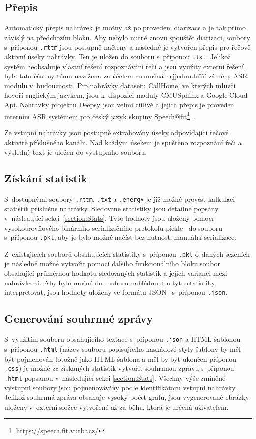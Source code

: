 \subsection{Přepis}
Automatický přepis nahrávek je možný až po provedení diarizace a je tak přímo závislý na předchozím bloku. Aby nebylo nutné znovu spouštět diarizaci, soubory s~příponou \texttt{.rttm} jsou postupně načteny a následně je vytvořen přepis pro řečově aktivní úseky nahrávky. Ten je uložen do souboru s~příponou \texttt{.txt}. Jelikož systém neobsahuje vlastní řešení rozpoznávání řeči a jsou využity externí řešení, byla tato část systému navržena za účelem co možná nejjednodušší záměny ASR modulu v~budoucnosti. Pro nahrávky datasetu CallHome, ve kterých mluvčí hovoří anglickým jazykem, jsou k~dispozici moduly CMUSphinx a Google Cloud Api. Nahrávky projektu Deepsy jsou velmi citlivé a jejich přepis je proveden interním ASR systémem pro český jazyk skupiny Speech@fit\footnote{\url{https://speech.fit.vutbr.cz/}}~\cite{ASR_FIT}. 

Ze vstupní nahrávky jsou postupně extrahovány úseky odpovídající řečové aktivitě příslušného kanálu. Nad každým úsekem je spuštěno rozpoznání řeči a výsledný text je uložen do výstupního souboru.

\subsection{Získání statistik}
S~dostupnými soubory \texttt{.rttm}, \texttt{.txt} a \texttt{.energy} je již možné provést kalkulaci statistik příslušné nahrávky. Sledované statistiky jsou detailně popsány v~následující sekci~\ref{section:Stats}. Tyto hodnoty jsou uloženy pomocí vysokoúrovňového binárního serializačního protokolu pickle~\cite{Pickle} do souboru s~příponou \texttt{.pkl}, aby je bylo možné načíst bez nutnosti manuální serializace.

Z~existujících souborů obsahujících statistiky s~příponou \texttt{.pkl} o~daných sezeních je následně možné vytvořit pomocí dalšího funkcionálního bloku soubor obsahující průměrnou hodnotu sledovaných statistik a jejich varianci mezi nahrávkami. Aby bylo možné do souboru nahlédnout a tyto statistiky interpretovat, jsou hodnoty uloženy ve formátu JSON~\cite{json} s~příponou \texttt{.json}.

\subsection{Generování souhrnné zprávy}
S~využitím souboru obsahujícího textace s~příponou \texttt{.json} a HTML šablonou s~příponou \texttt{.html} (název souboru popisujícího kaskádové styly šablony by měl být pojmenován totožně jako HTML šablona a měl by být ukončen příponou \texttt{.css}) je možné ze získaných statistik vytvořit souhrnnou zprávu s~příponou \texttt{.html} popsanou v~následující sekci \ref{section:Stats}. Všechny výše zmíněné výstupní soubory jsou pojmenovávány podle identifikátoru vstupní nahrávky. Jelikož souhrnná zpráva obsahuje vysoký počet grafů, jsou vygenerované obrázky uloženy v~externí složce vytvořené až za běhu, která je určená uživatelem. 



